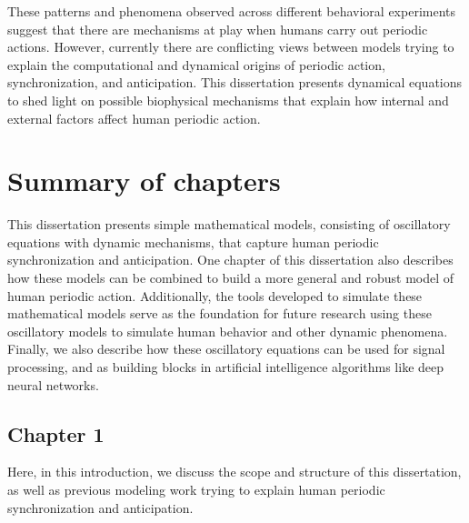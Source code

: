 \documentclass{report}
\begin{document}
These patterns and phenomena observed across different behavioral experiments suggest that there are  mechanisms at play when humans carry out periodic actions. However, currently there are conflicting views between models trying to explain the computational and dynamical origins of periodic action, synchronization, and anticipation. This dissertation presents dynamical equations to shed light on possible biophysical mechanisms that explain how internal and external factors affect human periodic action. 

\section{Summary of chapters}

This dissertation presents simple mathematical models, consisting of oscillatory equations with dynamic mechanisms, that capture human periodic synchronization and anticipation. One chapter of this dissertation also describes how these models can be combined to build a more general and robust model of human periodic action. Additionally, the tools developed to simulate these mathematical models serve as the foundation for future research using these oscillatory models to simulate human behavior and other dynamic phenomena. Finally, we also describe how these oscillatory equations can be used for signal processing, and as building blocks in artificial intelligence algorithms like deep neural networks.

\subsection{Chapter 1}
Here, in this introduction, we discuss the scope and structure of this dissertation, as well as previous modeling work trying to explain human periodic synchronization and anticipation.
\end{document}
